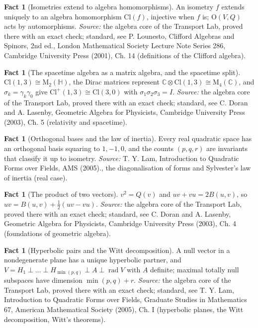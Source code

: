 \documentclass[11pt]{article}
\theoremstyle{definition}
\newtheorem{fact}[theorem]{Fact}
\theoremstyle{plain}
\providecommand{\C}{}\renewcommand{\C}{\mathbb{C}}
\providecommand{\Cl}{}\renewcommand{\Cl}{\mathrm{Cl}}
\providecommand{\HH}{}\renewcommand{\HH}{\mathbb{H}}
\providecommand{\Mat}{}\renewcommand{\Mat}{\mathrm{M}}
\begin{document}
\begin{fact}[Isometries extend to algebra homomorphisms]\label{c:std-algebra.functoriality}
An isometry $f$ extends uniquely to an algebra homomorphism $\Cl(f)$, injective when $f$ is; $\mathrm{O}(V, Q)$ acts by automorphisms.
\emph{Source:} the algebra core of the Transport Lab, proved there with an exact check; standard, see P. Lounesto, Clifford Algebras and Spinors, 2nd ed., London Mathematical Society Lecture Note Series 286, Cambridge University Press (2001), Ch. 14 (definitions of the Clifford algebra).
\end{fact}

\begin{fact}[The spacetime algebra as a matrix algebra, and the spacetime split]\label{c:std-algebra.sta-matrix}
$\Cl(1,3) \cong \Mat_2(\HH)$, the Dirac matrices represent $\C \otimes \Cl(1,3) \cong \Mat_4(\C)$, and $\sigma_k = \gamma_k\gamma_0$ give $\Cl^{+}(1,3) \cong \Cl(3,0)$ with $\sigma_1\sigma_2\sigma_3 = I$.
\emph{Source:} the algebra core of the Transport Lab, proved there with an exact check; standard, see C. Doran and A. Lasenby, Geometric Algebra for Physicists, Cambridge University Press (2003), Ch. 5 (relativity and spacetime).
\end{fact}

\begin{fact}[Orthogonal bases and the law of inertia]\label{c:std-algebra.sylvester-inertia}
Every real quadratic space has an orthogonal basis squaring to $1, -1, 0$, and the counts $(p, q, r)$ are invariants that classify it up to isometry.
\emph{Source:} T. Y. Lam, Introduction to Quadratic Forms over Fields, AMS (2005)., the diagonalisation of forms and Sylvester's law of inertia (real case).
\end{fact}

\begin{fact}[The product of two vectors]\label{c:std-algebra.vector-squares}
$v^{2} = Q(v)$ and $uv + vu = 2B(u, v)$, so $uv = B(u, v) + \tfrac12(uv - vu)$.
\emph{Source:} the algebra core of the Transport Lab, proved there with an exact check; standard, see C. Doran and A. Lasenby, Geometric Algebra for Physicists, Cambridge University Press (2003), Ch. 4 (foundations of geometric algebra).
\end{fact}

\begin{fact}[Hyperbolic pairs and the Witt decomposition]\label{c:std-algebra.witt-decomposition}
A null vector in a nondegenerate plane has a unique hyperbolic partner, and $V = H_1 \perp \dots \perp H_{\min(p,q)} \perp A \perp \operatorname{rad} V$ with $A$ definite; maximal totally null subspaces have dimension $\min(p,q) + r$.
\emph{Source:} the algebra core of the Transport Lab, proved there with an exact check; standard, see T. Y. Lam, Introduction to Quadratic Forms over Fields, Graduate Studies in Mathematics 67, American Mathematical Society (2005), Ch. I (hyperbolic planes, the Witt decomposition, Witt's theorems).
\end{fact}
\end{document}
